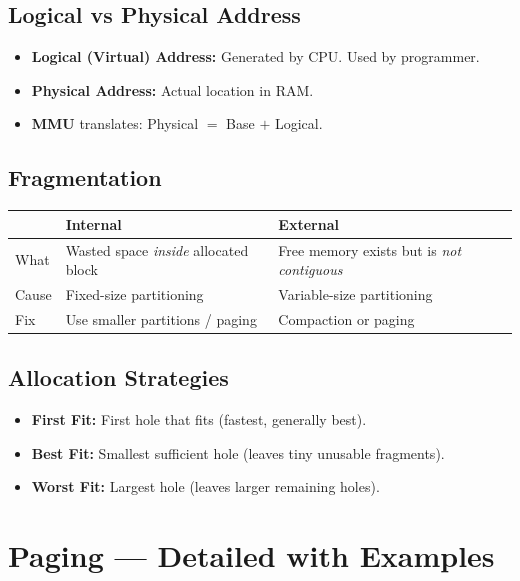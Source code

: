 \documentclass[12pt,a4paper]{article}
\begin{document}
\subsection{Logical vs Physical Address}
\begin{itemize}[leftmargin=*]
    \item \textbf{Logical (Virtual) Address:} Generated by CPU. Used by programmer.
    \item \textbf{Physical Address:} Actual location in RAM.
    \item \textbf{MMU} translates: Physical $=$ Base $+$ Logical.
\end{itemize}

\subsection{Fragmentation}
\begin{center}
\begin{tabular}{@{} l p{5.5cm} p{5.5cm} @{}}
\toprule
& \textbf{Internal} & \textbf{External} \\
\midrule
What & Wasted space \textit{inside} allocated block & Free memory exists but is \textit{not contiguous} \\
Cause & Fixed-size partitioning & Variable-size partitioning \\
Fix & Use smaller partitions / paging & Compaction or paging \\
\bottomrule
\end{tabular}
\end{center}

\subsection{Allocation Strategies}
\begin{itemize}[leftmargin=*]
    \item \textbf{First Fit:} First hole that fits (fastest, generally best).
    \item \textbf{Best Fit:} Smallest sufficient hole (leaves tiny unusable fragments).
    \item \textbf{Worst Fit:} Largest hole (leaves larger remaining holes).
\end{itemize}

\section{Paging --- Detailed with Examples}
\end{document}
